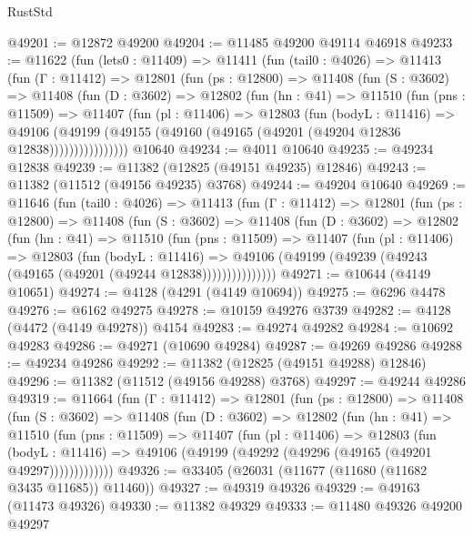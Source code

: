 \begin{lexlean}{RustStd}
\begin{coremodule}
@49201 := @12872 @49200
@49204 := @11485 @49200 @49114 @46918
@49233 := @11622
    (fun (lets0 : @11409) =>
    @11411
      (fun (tail0 : @4026) =>
      @11413
        (fun (Γ : @11412) =>
        @12801
          (fun (ps : @12800) =>
          @11408
            (fun (S : @3602) =>
            @11408
              (fun (D : @3602) =>
              @12802
                (fun (hn : @41) =>
                @11510
                  (fun (pns : @11509) =>
                  @11407
                    (fun (pl : @11406) =>
                    @12803
                      (fun (bodyL : @11416) =>
                      @49106
                        (@49199
                          (@49155 (@49160 (@49165 (@49201 (@49204 @12836 @12838))))))))))))))))
    @10640
@49234 := @4011 @10640
@49235 := @49234 @12838
@49239 := @11382 (@12825 (@49151 @49235) @12846)
@49243 := @11382 (@11512 (@49156 @49235) @3768)
@49244 := @49204 @10640
@49269 := @11646
    (fun (tail0 : @4026) =>
    @11413
      (fun (Γ : @11412) =>
      @12801
        (fun (ps : @12800) =>
        @11408
          (fun (S : @3602) =>
          @11408
            (fun (D : @3602) =>
            @12802
              (fun (hn : @41) =>
              @11510
                (fun (pns : @11509) =>
                @11407
                  (fun (pl : @11406) =>
                  @12803
                    (fun (bodyL : @11416) =>
                    @49106 (@49199 (@49239 (@49243 (@49165 (@49201 (@49244 @12838)))))))))))))))
@49271 := @10644 (@4149 @10651)
@49274 := @4128 (@4291 (@4149 @10694))
@49275 := @6296 @4478
@49276 := @6162 @49275
@49278 := @10159 @49276 @3739
@49282 := @4128 (@4472 (@4149 @49278)) @4154
@49283 := @49274 @49282
@49284 := @10692 @49283
@49286 := @49271 (@10690 @49284)
@49287 := @49269 @49286
@49288 := @49234 @49286
@49292 := @11382 (@12825 (@49151 @49288) @12846)
@49296 := @11382 (@11512 (@49156 @49288) @3768)
@49297 := @49244 @49286
@49319 := @11664
    (fun (Γ : @11412) =>
    @12801
      (fun (ps : @12800) =>
      @11408
        (fun (S : @3602) =>
        @11408
          (fun (D : @3602) =>
          @12802
            (fun (hn : @41) =>
            @11510
              (fun (pns : @11509) =>
              @11407
                (fun (pl : @11406) =>
                @12803
                  (fun (bodyL : @11416) =>
                  @49106 (@49199 (@49292 (@49296 (@49165 (@49201 @49297)))))))))))))
@49326 := @33405 (@26031 (@11677 (@11680 (@11682 @3435 @11685)) @11460))
@49327 := @49319 @49326
@49329 := @49163 (@11473 @49326)
@49330 := @11382 @49329
@49333 := @11480 @49326 @49200 @49297

\end{coremodule}
\end{lexlean}
